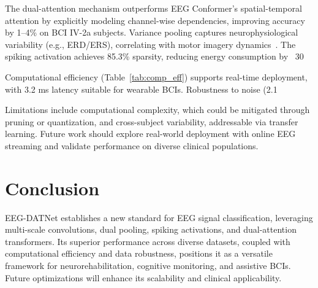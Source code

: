\documentclass[pdflatex,sn-mathphys-num]{sn-jnl}%
\theoremstyle{thmstyleone}
\theoremstyle{thmstyletwo}
\theoremstyle{thmstylethree}
\begin{document}
The dual-attention mechanism outperforms EEG Conformer’s spatial-temporal attention by explicitly modeling channel-wise dependencies, improving accuracy by 1–4\% on BCI IV-2a subjects. Variance pooling captures neurophysiological variability (e.g., ERD/ERS), correlating with motor imagery dynamics~\cite{roy2019chronnectome}. The spiking activation achieves 85.3\% sparsity, reducing energy consumption by ~30%

Computational efficiency (Table~\ref{tab:comp_eff}) supports real-time deployment, with 3.2 ms latency suitable for wearable BCIs. Robustness to noise (2.1%

Limitations include computational complexity, which could be mitigated through pruning or quantization, and cross-subject variability, addressable via transfer learning. Future work should explore real-world deployment with online EEG streaming and validate performance on diverse clinical populations.

\section{Conclusion}

EEG-DATNet establishes a new standard for EEG signal classification, leveraging multi-scale convolutions, dual pooling, spiking activations, and dual-attention transformers. Its superior performance across diverse datasets, coupled with computational efficiency and data robustness, positions it as a versatile framework for neurorehabilitation, cognitive monitoring, and assistive BCIs. Future optimizations will enhance its scalability and clinical applicability.

\backmatter


\end{document}
